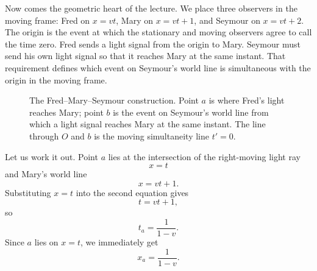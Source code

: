 Now comes the geometric heart of the lecture. We place three observers in the moving frame: Fred on \(x=vt\), Mary on \(x=vt+1\), and Seymour on \(x=vt+2\). The origin is the event at which the stationary and moving observers agree to call the time zero. Fred sends a light signal from the origin to Mary. Seymour must send his own light signal so that it reaches Mary at the same instant. That requirement defines which event on Seymour's world line is simultaneous with the origin in the moving frame.

\begin{figure}
\centering
{}
\caption{The Fred--Mary--Seymour construction. Point \(a\) is where Fred's light reaches Mary; point \(b\) is the event on Seymour's world line from which a light signal reaches Mary at the same instant. The line through \(O\) and \(b\) is the moving simultaneity line \(t'=0\).}
\end{figure}

Let us work it out. Point \(a\) lies at the intersection of the right-moving light ray
\begin{equation}
x=t
\end{equation}
and Mary's world line
\begin{equation}
x=vt+1.
\end{equation}
Substituting \(x=t\) into the second equation gives
\begin{equation}
t=vt+1,
\end{equation}
so
\begin{equation}
t_a=\frac{1}{1-v}.
\end{equation}
Since \(a\) lies on \(x=t\), we immediately get
\begin{equation}
x_a=\frac{1}{1-v}.
\end{equation}

